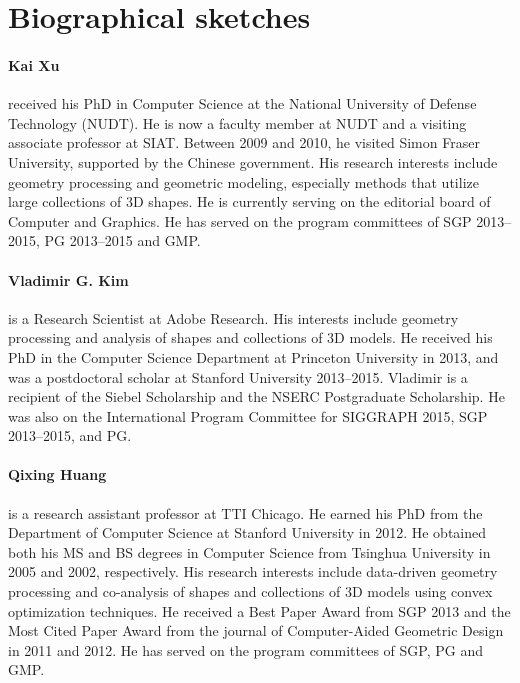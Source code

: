 \section*{Biographical sketches}
\label{sec:bios}

\paragraph*{Kai Xu} received his PhD in Computer Science at the National University of Defense Technology (NUDT).
He is now a faculty member at NUDT and a visiting associate professor at SIAT.
Between 2009 and 2010, he visited Simon Fraser University, supported by the Chinese government. His research interests include geometry processing and geometric modeling, especially methods that utilize large collections of 3D shapes.
He is currently serving on the editorial board of Computer and Graphics.
He has served on the program committees of SGP 2013--2015, PG 2013--2015 and GMP.


\paragraph*{Vladimir G. Kim} is a Research Scientist at Adobe Research. His interests include geometry processing and analysis of shapes and collections of 3D models. He received his PhD in the Computer Science Department at Princeton University in 2013, and was a postdoctoral scholar at Stanford University 2013--2015. Vladimir is a recipient of the Siebel Scholarship and the NSERC Postgraduate Scholarship. He was also on the International Program Committee for SIGGRAPH 2015, SGP 2013--2015, and PG.


\paragraph*{Qixing Huang} is a research assistant professor at TTI Chicago. He earned his PhD from the Department of Computer Science at Stanford University in 2012. He obtained both his MS and BS degrees in Computer Science from Tsinghua University in 2005 and 2002, respectively. His research interests include data-driven geometry processing and co-analysis of shapes and collections of 3D models using convex optimization techniques. He received a Best Paper Award from SGP 2013 and the Most Cited Paper Award from the journal of Computer-Aided Geometric Design in 2011 and 2012. He has served on the program committees of SGP, PG and GMP.

